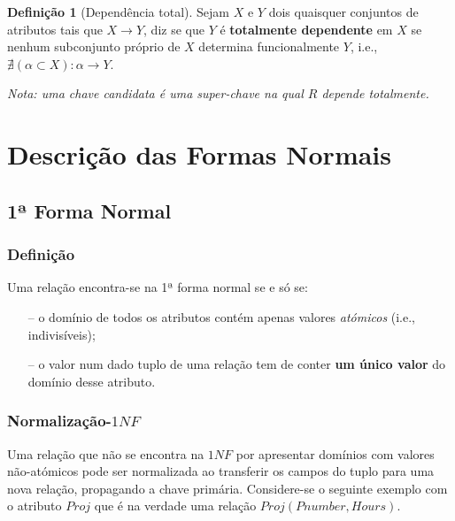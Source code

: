 \documentclass[oneside]{book}
\theoremstyle{definition}
\newtheorem{definition}{Definição}
\begin{document}
\begin{definition} [Dependência total]
    Sejam $X$ e $Y$ dois quaisquer conjuntos de atributos tais que $X \rightarrow Y$, diz se que $Y$ é \textbf{totalmente dependente} em $X$ se nenhum subconjunto próprio de $X$ determina funcionalmente $Y$, i.e., $\nexists(\alpha \subset X): \alpha \rightarrow Y$.
\end{definition}

\textit{Nota: uma chave candidata é uma super-chave na qual $R$ depende totalmente.}

\section{Descrição das Formas Normais}

\subsection{1ª Forma Normal}

\subsubsection*{Definição}

Uma relação encontra-se na 1ª forma normal se e só se:
\begin{itemize}
    \itemsep0cm
    \item[--] o domínio de todos os atributos contém apenas valores \textit{atómicos} (i.e., indivisíveis);
    \item[--] o valor num dado tuplo de uma relação tem de conter \textbf{um único valor} do domínio desse atributo. 
\end{itemize}

\subsubsection*{Normalização-$1NF$}

Uma relação que não se encontra na $1NF$ por apresentar domínios com valores não-atómicos pode ser normalizada ao transferir os campos do tuplo para uma nova relação, propagando a chave primária. Considere-se o seguinte exemplo com o atributo $Proj$ que é na verdade uma relação $Proj(Pnumber, Hours)$.
\end{document}
